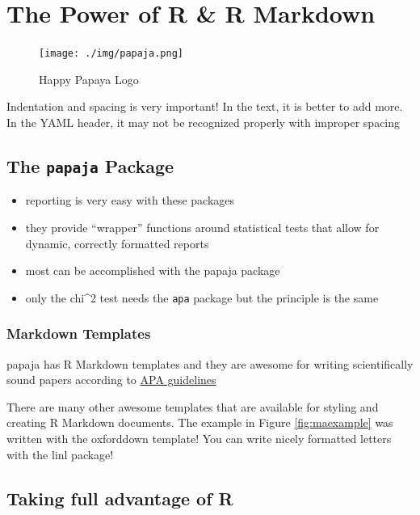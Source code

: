 \documentclass[
]{book}
\begin{document}
\chapter{The Power of R \& R Markdown}\label{the-power-of-r-r-markdown}

\begin{figure}
\centering
\texttt{[image: ./img/papaja.png]}
\caption{Happy Papaya Logo}
\end{figure}

Indentation and spacing is very important!
In the text, it is better to add more.
In the YAML header, it may not be recognized properly with improper spacing

\section{\texorpdfstring{The \texttt{papaja} Package}{The papaja Package}}\label{the-papaja-package}

\begin{itemize}
\item
  reporting is very easy with these packages
\item
  they provide ``wrapper'' functions around statistical tests that allow for dynamic, correctly formatted reports
\item
  most can be accomplished with the papaja package
\item
  only the chi\^{}2 test needs the \texttt{apa} package but the principle is the same
\end{itemize}

\subsection{Markdown Templates}\label{markdown-templates}

papaja has R Markdown templates and they are awesome for writing scientifically sound papers according to \href{https://apastyle.apa.org/style-grammar-guidelines}{APA guidelines}

There are many other awesome templates that are available for styling and creating R Markdown documents.
The example in Figure \ref{fig:maexample} was written with the oxforddown template!
You can write nicely formatted letters with the linl package!

\section{Taking full advantage of R}\label{taking-full-advantage-of-r}
\end{document}
